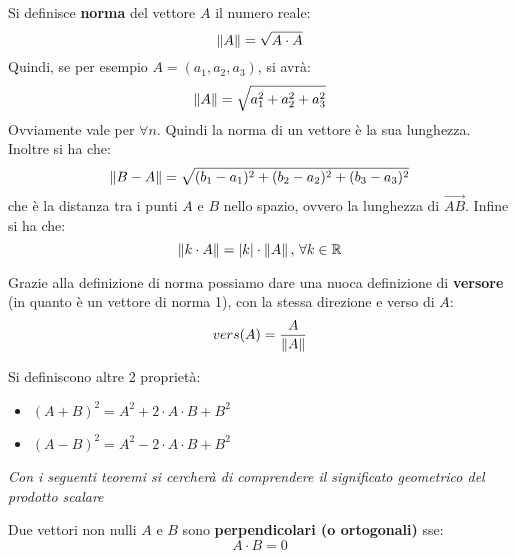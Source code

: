 \documentclass[a4paper,12pt, oneside]{book}
\begin{document}
\begin{definizione}
Si definisce \textbf{norma} del vettore $A$ il numero reale:
$$\left\lVert {A} \right\rVert=\sqrt{A\cdot A}$$
Quindi, se per esempio $A=(a_1,a_2,a_3)$, si avrà:
$$\left\lVert {A} \right\rVert=\sqrt{a_1^2+a_2^2+a_3^2}$$
Ovviamente vale per $\forall n$.
Quindi la norma di un vettore è la sua lunghezza.\\
Inoltre si ha che:
$$\left\lVert {B-A} \right\rVert=\sqrt{(b_1-a_1)^2+(b_2-a_2)^2+(b_3-a_3)^2}$$
che è la distanza tra i punti $A$ e $B$ nello spazio, ovvero la lunghezza di $\vec{AB}$. Infine si ha che:
$$\left\lVert {k\cdot A} \right\rVert=|k|\cdot \left\lVert {A} \right\rVert,\, \forall k \in \mathbb{R}$$
\end{definizione}
\newpage
\begin{nota}
Grazie alla definizione di norma possiamo dare una nuoca definizione di \textbf{versore} (in quanto è un vettore di norma 1), con la stessa direzione e verso di $A$:
$$vers(A)=\frac{A}{\left\lVert {A} \right\rVert}$$
\end{nota}
Si definiscono altre 2 proprietà:
\begin{itemize}
\item $(A+B)^2=A^2+2\cdot A\cdot B+B^2$
\item $(A-B)^2=A^2-2\cdot A\cdot B+B^2$
\end{itemize}
\textit{Con i seguenti teoremi si cercherà di comprendere il significato geometrico del prodotto scalare}
\begin{teorema}
Due vettori non nulli $A$ e $B$ sono \textbf{perpendicolari (o ortogonali)} sse:
$$A\cdot B=0$$
\end{teorema}
\end{document}
